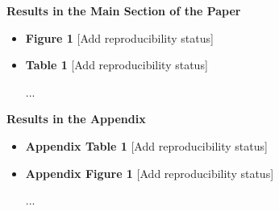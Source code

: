 \documentclass{tufte-handout}
\begin{document}
\textbf{Results in the Main Section of the Paper}


\begin{itemize}

\item \textbf{Figure 1} \textcolor{OliveGreen}{[Add reproducibility status]}

\item \textbf{Table 1} \textcolor{OliveGreen}{[Add reproducibility status]}

...

\end{itemize}

\textbf{Results in the Appendix}


\begin{itemize}

\item \textbf{Appendix Table 1} \textcolor{OliveGreen}{[Add reproducibility status]}

\item \textbf{Appendix Figure 1} \textcolor{OliveGreen}{[Add reproducibility status]}

...

\end{itemize}
\end{document}
